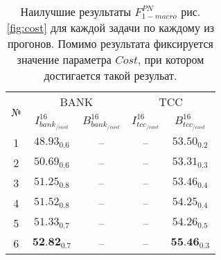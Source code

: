 \begin{table}[htp!]
\centering
\caption{Наилучшие результаты $F_{1-macro}^{PN}$ рис. \ref{fig:cost}
    для каждой задачи по каждому из прогонов.
    Помимо результата фиксируется значение параметра $Cost$, при котором
    достигается такой резульат.
}
\label{table:cost}
\begin{tabular}{ccccc}
\hline
\multicolumn{1}{c|}{\multirow{2}{*}{№}} & \multicolumn{2}{c|}{BANK}                                                   & \multicolumn{2}{c}{TCC}                                           \\ \cline{2-5}
\multicolumn{1}{c|}{}                   & \multicolumn{1}{c|}{$I_{bank_{/cost}}^{16}$} & \multicolumn{1}{c|}{$B_{bank_{/cost}}^{16}$} & \multicolumn{1}{c|}{$I_{tcc_{/cost}}^{16}$}  & $B_{tcc_{/cost}}^{16}$             \\ \hline
1                                       & $48.93_{0.6}$                                & --                                           & --                                           & $53.50_{0.2}$                                  \\
2                                       & $50.69_{0.6}$                                & --                                           & --                                           & $53.31_{0.3}$                                  \\
3                                       & $51.25_{0.8}$                                & --                                           & --                                           & $53.46_{0.4}$                                  \\
4                                       & $51.52_{0.8}$                                & --                                           & --                                           & $54.25_{0.4}$                                  \\
5                                       & $51.33_{0.7}$                                & --                                           & --                                           & $54.26_{0.5}$                                  \\
6                                       & $\textbf{52.82}_{0.7}$                       & --                                           & --                                           & $\textbf{55.46}_{0.3}$                         \\ \hline
\end{tabular}
\end{table}

